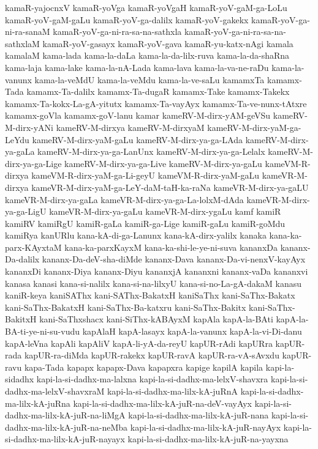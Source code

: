 {kamaR-yajocnxV
kamaR-yoVga
kamaR-yoVgaH
kamaR-yoV-gaM-ga-LoLu
kamaR-yoV-gaM-gaLu
kamaR-yoV-ga-dalilx
kamaR-yoV-gakekx
kamaR-yoV-ga-ni-ra-sanaM
kamaR-yoV-ga-ni-ra-sa-na-sathxla
kamaR-yoV-ga-ni-ra-sa-na-sathxlaM
kamaR-yoV-gasayx
kamaR-yoV-gava
kamaR-yu-katx-nAgi
kamala
kamalaM
kama-lada
kama-la-daLa
kama-la-da-lilx-ruva
kama-la-da-shaRna
kama-laja
kama-lake
kama-la-nA-Lada
kama-lava
kama-la-va-ne-raDu
kama-la-vanunx
kama-la-veMdU
kama-la-veMdu
kama-la-ve-saLu
kamamxTa
kamamx-Tada
kamamx-Ta-dalilx
kamamx-Ta-dugaR
kamamx-Take
kamamx-Takekx
kamamx-Ta-kokx-La-gA-yitutx
kamamx-Ta-vayAyx
kamamx-Ta-ve-nunx-tAtxre
kamamx-goVla
kamamx-goV-lanu
kamar
kameRV-M-dirx-yAM-geVSu
kameRV-M-dirx-yANi
kameRV-M-dirxya
kameRV-M-dirxyaM
kameRV-M-dirx-yaM-ga-LeYdu
kameRV-M-dirx-yaM-gaLu
kameRV-M-dirx-ya-ga-LAda
kameRV-M-dirx-ya-gaLa
kameRV-M-dirx-ya-ga-LanUnx
kameRV-M-dirx-ya-ga-Lelalx
kameRV-M-dirx-ya-ga-Lige
kameRV-M-dirx-ya-ga-Live
kameRV-M-dirx-ya-gaLu
kameVM-R-dirxya
kameVM-R-dirx-yaM-ga-Li-geyU
kameVM-R-dirx-yaM-gaLu
kameVR-M-dirxya
kameVR-M-dirx-yaM-ga-LeY-daM-taH-ka-raNa
kameVR-M-dirx-ya-gaLU
kameVR-M-dirx-ya-gaLa
kameVR-M-dirx-ya-ga-La-lolxM-dAda
kameVR-M-dirx-ya-ga-LigU
kameVR-M-dirx-ya-gaLu
kameVR-M-dirx-ygaLu
kamf
kamiR
kamiRV
kamiRgU
kamiR-gaLa
kamiR-ga-Lige
kamiR-gaLu
kamiR-goMdu
kamiRya
kanURlu
kana-kA-di-ga-Lanunx
kana-kA-dirx-yalilx
kanaka
kana-ka-parx-KAyxtaM
kana-ka-parxKayxM
kana-ka-shi-le-ye-ni-suva
kananxDa
kananx-Da-dalilx
kananx-Da-deV-sha-diMde
kananx-Dava
kananx-Da-vi-nenxV-kayAyx
kananxDi
kananx-Diya
kananx-Diyu
kananxjA
kananxni
kananx-vaDa
kananxvi
kanasa
kanasi
kana-si-nalilx
kana-si-na-lilxyU
kana-si-no-La-gA-dakaM
kanasu
kaniR-keya
kaniSAThx
kani-SAThx-BakatxH
kaniSaThx
kani-SaThx-Bakatx
kani-SaThx-BakatxH
kani-SaThx-Ba-katxru
kani-SaThx-Bakitx
kani-SaThx-BakitxH
kani-SaThxshacx
kani-SiThx-kABAyxM
kapAla
kapA-la-BAti
kapA-la-BA-ti-ye-ni-su-vudu
kapAlaH
kapA-lasayx
kapA-la-vanunx
kapA-la-vi-Di-danu
kapA-leVna
kapAli
kapAliV
kapA-li-yA-da-reyU
kapUR-rAdi
kapURra
kapUR-rada
kapUR-ra-diMda
kapUR-rakekx
kapUR-ravA
kapUR-ra-vA-sAvxdu
kapUR-ravu
kapa-Tada
kapapx
kapapx-Dava
kapapxra
kapige
kapilA
kapila
kapi-la-sidadhx
kapi-la-si-dadhx-ma-lalxna
kapi-la-si-dadhx-ma-lelxV-shavxra
kapi-la-si-dadhx-ma-lelxV-shavxraM
kapi-la-si-dadhx-ma-lilx-kA-juRnA
kapi-la-si-dadhx-ma-lilx-kA-juRna
kapi-la-si-dadhx-ma-lilx-kA-juR-na-deV-vayAyx
kapi-la-si-dadhx-ma-lilx-kA-juR-na-liMgA
kapi-la-si-dadhx-ma-lilx-kA-juR-nana
kapi-la-si-dadhx-ma-lilx-kA-juR-na-neMba
kapi-la-si-dadhx-ma-lilx-kA-juR-nayAyx
kapi-la-si-dadhx-ma-lilx-kA-juR-nayayx
kapi-la-si-dadhx-ma-lilx-kA-juR-na-yayxna
}
